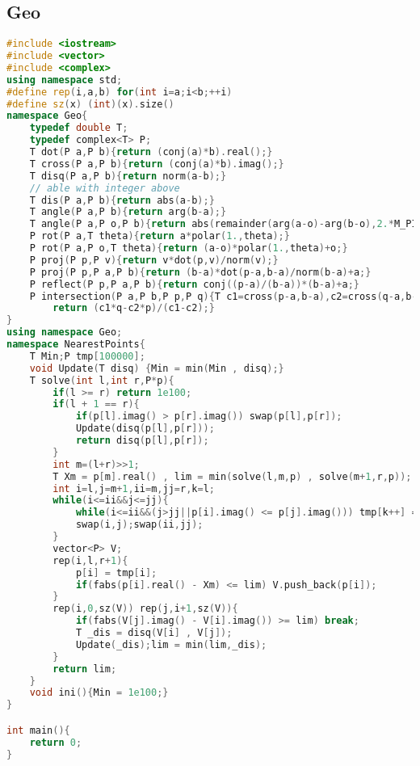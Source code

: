 \subsection{Geo}
\begin{lstlisting}[language=C++]
#include <iostream>
#include <vector>
#include <complex>
using namespace std;
#define rep(i,a,b) for(int i=a;i<b;++i)
#define sz(x) (int)(x).size()
namespace Geo{
    typedef double T;
    typedef complex<T> P;
    T dot(P a,P b){return (conj(a)*b).real();}
    T cross(P a,P b){return (conj(a)*b).imag();}
    T disq(P a,P b){return norm(a-b);}
    // able with integer above
    T dis(P a,P b){return abs(a-b);}
    T angle(P a,P b){return arg(b-a);}
    T angle(P a,P o,P b){return abs(remainder(arg(a-o)-arg(b-o),2.*M_PI));}
    P rot(P a,T theta){return a*polar(1.,theta);}
    P rot(P a,P o,T theta){return (a-o)*polar(1.,theta)+o;}
    P proj(P p,P v){return v*dot(p,v)/norm(v);}
    P proj(P p,P a,P b){return (b-a)*dot(p-a,b-a)/norm(b-a)+a;}
    P reflect(P p,P a,P b){return conj((p-a)/(b-a))*(b-a)+a;}
    P intersection(P a,P b,P p,P q){T c1=cross(p-a,b-a),c2=cross(q-a,b-a);
        return (c1*q-c2*p)/(c1-c2);}
}
using namespace Geo;
namespace NearestPoints{
    T Min;P tmp[100000];
    void Update(T disq) {Min = min(Min , disq);}
    T solve(int l,int r,P*p){
        if(l >= r) return 1e100;
        if(l + 1 == r){
            if(p[l].imag() > p[r].imag()) swap(p[l],p[r]);
            Update(disq(p[l],p[r]));
            return disq(p[l],p[r]);
        }
        int m=(l+r)>>1;
        T Xm = p[m].real() , lim = min(solve(l,m,p) , solve(m+1,r,p));
        int i=l,j=m+1,ii=m,jj=r,k=l;
        while(i<=ii&&j<=jj){
            while(i<=ii&&(j>jj||p[i].imag() <= p[j].imag())) tmp[k++] = p[i++];
            swap(i,j);swap(ii,jj);
        }
        vector<P> V;
        rep(i,l,r+1){
            p[i] = tmp[i];
            if(fabs(p[i].real() - Xm) <= lim) V.push_back(p[i]);
        }
        rep(i,0,sz(V)) rep(j,i+1,sz(V)){
            if(fabs(V[j].imag() - V[i].imag()) >= lim) break;
            T _dis = disq(V[i] , V[j]);
            Update(_dis);lim = min(lim,_dis);
        }
        return lim;
    }
    void ini(){Min = 1e100;}
}

int main(){
    return 0;
}
\end{lstlisting}
